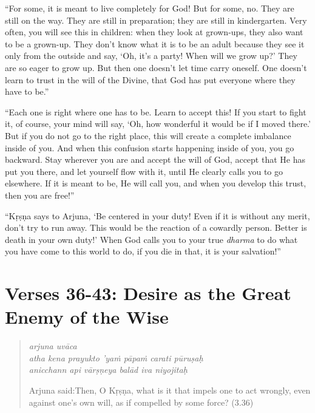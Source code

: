 \documentclass[12pt, twoside, openright]{memoir}
\begin{document}
\enquote{For some, it is meant to live completely for God! But for some, no. They are still on the way. They are still in preparation; they are still in kindergarten. Very often, you will see this in children: when they look at grown-ups, they also want to be a grown-up. They don’t know what it is to be an adult because they see it only from the outside and say, \enquote{Oh, it’s a party! When will we grow up?} They are so eager to grow up. But then one doesn’t let time carry oneself. One doesn’t learn to trust in the will of the Divine, that God has put everyone where they have to be.}

\enquote{Each one is right where one has to be. Learn to accept this! If you start to fight it, of course, your mind will say, \enquote{Oh, how wonderful it would be if I moved there.} But if you do not go to the right place, this will create a complete imbalance inside of you. And when this confusion starts happening inside of you, you go backward. Stay wherever you are and accept the will of God, accept that He has put you there, and let yourself flow with it, until He clearly calls you to go elsewhere. If it is meant to be, He will call you, and when you develop this trust, then you are free!}

\enquote{Kṛṣṇa says to Arjuna, \enquote{Be centered in your duty! Even if it is without any merit, don’t try to run away. This would be the reaction of a cowardly person. Better is death in your own duty!} When God calls you to your true \textit{dharma} to do what you have come to this world to do, if you die in that, it is your salvation!}

\section{Verses 36-43: Desire as the Great Enemy of the Wise}\label{sec-verses-36-43-desire-as-the-great-enemy-of-the-wise}

\par
\begin{verse}
\textit{arjuna uvāca} \\
\textit{atha kena prayukto ’yaṁ pāpaṁ carati pūruṣaḥ} \\
\textit{anicchann api vārṣṇeya balād iva niyojitaḥ}

\noindent \quad Arjuna said:\linebreak Then, O Kṛṣṇa, what is it that impels one to act wrongly, even against one’s own will, as if compelled by some force? (3.36)
\end{verse}
\par
\end{document}

